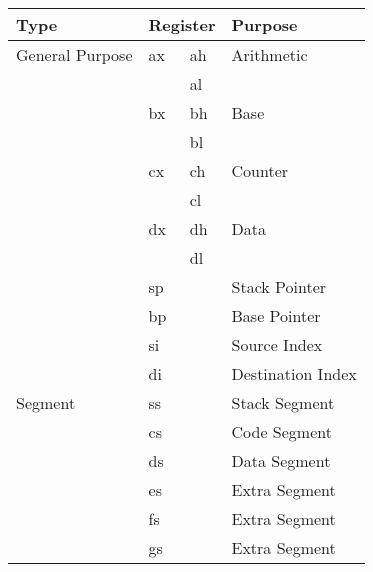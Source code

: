 \documentclass{article}
\begin{document}
\begin{center}
	\begin{tabular}{llll}
		\toprule
		Type            & \multicolumn{2}{l}{Register} & Purpose           \\
		\midrule
		General Purpose & ax & ah                      & Arithmetic        \\
		                &    & al                      &                   \\
		\addlinespace %
		                & bx & bh                      & Base              \\
		                &    & bl                      &                   \\
		\addlinespace
		                & cx & ch                      & Counter           \\
		                &    & cl                      &                   \\
		\addlinespace
		                & dx & dh                      & Data              \\
		                &    & dl                      &                   \\
		\cmidrule{2-4}
		                & \multicolumn{2}{l}{sp}       & Stack Pointer     \\
		                & \multicolumn{2}{l}{bp}       & Base Pointer      \\
		                & \multicolumn{2}{l}{si}       & Source Index      \\
		                & \multicolumn{2}{l}{di}       & Destination Index \\
		\midrule
		Segment         & \multicolumn{2}{l}{ss}       & Stack Segment     \\
		                & \multicolumn{2}{l}{cs}       & Code Segment      \\
		                & \multicolumn{2}{l}{ds}       & Data Segment      \\
		                & \multicolumn{2}{l}{es}       & Extra Segment     \\
		                & \multicolumn{2}{l}{fs}       & Extra Segment     \\
		                & \multicolumn{2}{l}{gs}       & Extra Segment     \\
		\bottomrule
	\end{tabular}
\end{center}
\end{document}
